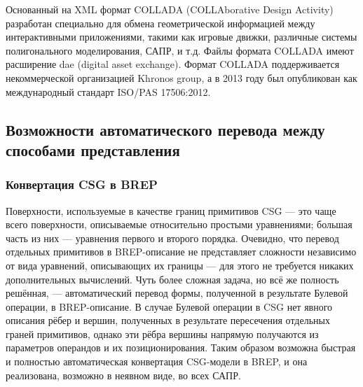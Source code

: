 
Основанный на XML формат COLLADA (COLLAborative Design Activity) разработан специально для обмена геометрической информацией между интерактивными приложениями, такими как игровые движки, различные системы полигонального моделирования, САПР, и т.д. Файлы формата COLLADA имеют расширение dae (digital asset exchange). Формат COLLADA поддерживается некоммерческой организацией Khronos group, а в 2013 году был опубликован как международный стандарт ISO/PAS 17506:2012.

%                                                                             

\subsection{Возможности автоматического перевода между способами представления}\label{sec:secAutoConversion}


\subsubsection{Конвертация CSG в BREP}\label{sec:secCSGtoBREP}

Поверхности, используемые в качестве границ примитивов CSG --- это чаще всего поверхности, описываемые относительно простыми уравнениями; большая часть из них --- уравнения первого и второго порядка. Очевидно, что перевод отдельных примитивов в BREP-описание не представляет сложности независимо от вида уравнений, описывающих их границы --- для этого не требуется никаких дополнительных вычислений. Чуть более сложная задача, но всё же полность решённая, --- автоматический перевод формы, полученной в результате Булевой операции, в BREP-описание. В случае Булевой операции в CSG нет явного описания рёбер и вершин, полученных в результате пересечения отдельных граней примитивов, однако эти рёбра вершины напрямую получаются из параметров операндов и их позиционирования. Таким образом возможна быстрая и полностью автоматическая конвертация CSG-модели в BREP, и она реализована, возможно в неявном виде, во всех САПР.

